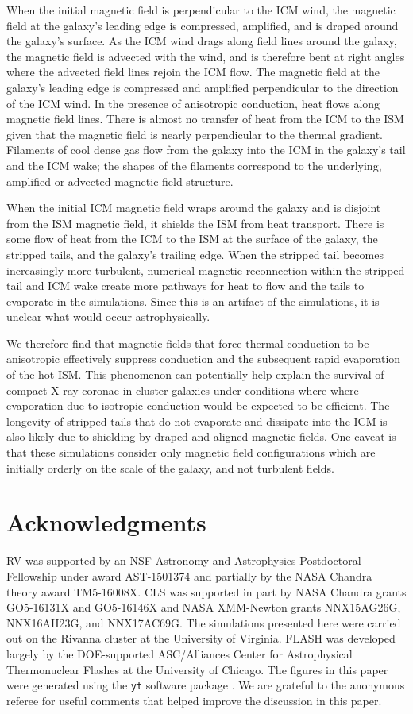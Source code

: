 \documentclass[twocolumn]{aastex6}
\begin{document}
When the initial magnetic field is perpendicular to the ICM wind, the magnetic field at the galaxy's leading edge is compressed, amplified, and is draped around the galaxy's surface. As the ICM wind drags along field lines around the galaxy, the magnetic field is advected with the wind, and is therefore bent at right angles where the advected field lines rejoin the ICM flow. The magnetic field at the galaxy's leading edge is compressed and amplified perpendicular to the direction of the ICM wind. In the presence of anisotropic conduction, heat flows along magnetic field lines. There is almost no transfer of heat from the ICM to the ISM given that the magnetic field is nearly perpendicular to the thermal gradient. Filaments of cool dense gas flow from the galaxy into the ICM in the galaxy's tail and the ICM wake; the shapes of the filaments correspond to the underlying, amplified or advected magnetic field structure.  

When the initial ICM magnetic field wraps around the galaxy and is disjoint from the ISM magnetic field, it shields the ISM from heat transport. There is some flow of heat from the ICM to the ISM at the surface of the galaxy, the stripped tails, and the galaxy's trailing edge. When the stripped tail becomes increasingly more turbulent, numerical magnetic reconnection within the stripped tail and ICM wake create more pathways for heat to flow and the tails to evaporate in the simulations.
Since this is an artifact of the simulations, it is unclear what would occur astrophysically.

We therefore find that magnetic fields that force thermal conduction to be anisotropic effectively suppress conduction and the subsequent rapid evaporation of the hot ISM. This phenomenon can potentially help explain the survival of compact X-ray coronae in cluster galaxies under conditions where where evaporation due to isotropic conduction would be expected to be efficient. The longevity of stripped tails that do not evaporate and dissipate into the ICM is also likely due to shielding by draped and aligned magnetic fields. One caveat is that these simulations consider only magnetic field configurations which are initially orderly on the scale of the galaxy, and not turbulent fields.


\section*{Acknowledgments}
RV was supported by an NSF Astronomy and Astrophysics Postdoctoral Fellowship under award AST-1501374 and partially by the NASA Chandra theory award TM5-16008X. CLS was supported in part by NASA Chandra grants GO5-16131X and GO5-16146X and NASA XMM-Newton grants NNX15AG26G, NNX16AH23G, and NNX17AC69G. The simulations presented here were carried out on the Rivanna cluster at the University of Virginia. FLASH was developed largely by the DOE-supported ASC/Alliances Center for Astrophysical Thermonuclear Flashes at the University of Chicago. The figures in this paper were generated using the \texttt{yt} software package \citep{Turk11}. We are grateful to the anonymous referee for useful comments that helped improve the discussion in this paper. 


\end{document}
